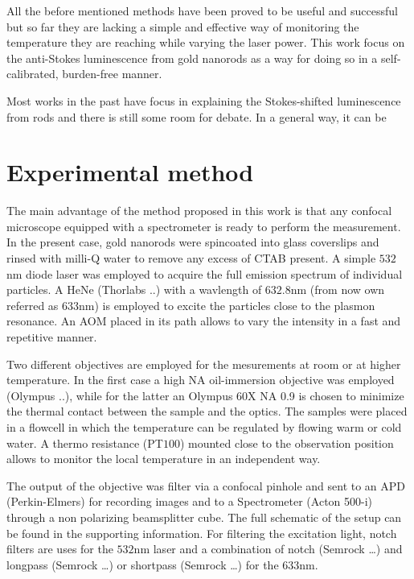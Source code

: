 \documentclass[twocolumn]{article}
\begin{document}
All the before mentioned methods have been proved to be useful and successful
but so far they are lacking a simple and effective way of monitoring the
temperature they are reaching while varying the laser power. This work focus on
the anti-Stokes luminescence from gold nanorods as a way for doing so in a
self-calibrated, burden-free manner. 

Most works in the past have focus in explaining the Stokes-shifted luminescence
from rods and there is still some room for debate. In a general way, it can be 

\section{Experimental method}
The main advantage of the method proposed in this work is that any confocal
microscope equipped with a spectrometer is ready to perform the measurement. In
the present case, gold nanorods were spincoated into glass coverslips and rinsed
with milli-Q water to remove any excess of CTAB present. A simple $532$nm diode
laser was employed to acquire the full emission spectrum of individual
particles. A HeNe (Thorlabs ..) with a wavlength of $632.8$nm (from now own
referred as $633$nm) is employed to excite the particles close to the plasmon
resonance. An AOM placed in its path allows to vary the intensity in a fast and
repetitive manner.

Two different objectives are employed for the mesurements at room or at higher
temperature. In the first case a high NA oil-immersion objective was employed
(Olympus ..), while for the latter an Olympus 60X NA 0.9 is chosen to minimize
the thermal contact between the sample and the optics. The samples were placed
in a flowcell in which the temperature can be regulated by flowing warm or cold
water. A thermo resistance (PT$100$) mounted close to the observation position
allows to monitor the local temperature in an independent way.

The output of the objective was filter via a confocal pinhole and sent to an APD
(Perkin-Elmers) for recording images and to a Spectrometer (Acton 500-i) through
a non polarizing beamsplitter cube. The full schematic of the setup can be found
in the supporting information. For filtering the excitation light, notch filters
are uses for the $532$nm laser and a combination of notch (Semrock \ldots) and
longpass (Semrock \ldots) or shortpass (Semrock \ldots) for the $633$nm.
\end{document}

